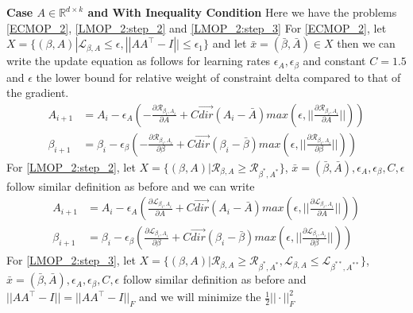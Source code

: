 \newline \textbf{Case $A \in \mathbb{R}^{d \times k}$ and With Inequality Condition}
\newline Here we have the problems \ref{ECMOP_2}, \ref{LMOP_2:step_2} and \ref{LMOP_2:step_3}
\newline For \ref{ECMOP_2}, let $X = \{(\beta, A) | \mathcal{L}_{\beta, A} \le \epsilon, ||AA^\top - I|| \le \epsilon_1\}$ and let $\bar{x} = (\bar{\beta},\bar{A}) \in X$ then we can write the update equation as follows for learning rates $\epsilon_A,\epsilon_{\beta}$ and constant $C=1.5$ and $\epsilon$ the lower bound for relative weight of constraint delta compared to that of the gradient.
\begin{equation}
\begin{aligned}
A_{i+1} &= A_{i} - \epsilon_A ( -\frac{\partial \mathcal{R}_{\beta_i, A_i}}{\partial A} + C \vec{dir}(A_i-\bar{A}) max(\epsilon,||\frac{\partial \mathcal{R}_{\beta_i, A_i}}{\partial A}||))\\
\beta_{i+1} &= \beta_{i} - \epsilon_{\beta} ( -\frac{\partial \mathcal{R}_{\beta_i, A_i}}{\partial \beta} + C \vec{dir}(\beta_i-\bar{\beta}) max(\epsilon,||\frac{\partial \mathcal{R}_{\beta_i, A_i}}{\partial \beta}||))
\end{aligned}    
\end{equation}
\newline For \ref{LMOP_2:step_2}, let $X = \{(\beta, A) | \mathcal{R}_{\beta, A} \ge \mathcal{R}_{\beta^{*}, A^{*}}\}$, $\bar{x} = (\bar{\beta},\bar{A}), \epsilon_A, \epsilon_{\beta}, C, \epsilon$ follow similar definition as before and we can write
\begin{equation}
\begin{aligned}
A_{i+1} &= A_{i} - \epsilon_A ( \frac{\partial \mathcal{L}_{\beta_i, A_i}}{\partial A} + C \vec{dir}(A_i-\bar{A}) max(\epsilon,||\frac{\partial \mathcal{L}_{\beta_i, A_i}}{\partial A}||))\\
\beta_{i+1} &= \beta_{i} - \epsilon_{\beta} ( \frac{\partial \mathcal{L}_{\beta_i, A_i}}{\partial \beta} + C \vec{dir}(\beta_i-\bar{\beta}) max(\epsilon,||\frac{\partial \mathcal{L}_{\beta_i, A_i}}{\partial \beta}||))
\end{aligned}    
\end{equation}
\newline For \ref{LMOP_2:step_3}, let $X = \{(\beta, A) | \mathcal{R}_{\beta, A} \ge \mathcal{R}_{\beta^{*}, A^{*}}, \mathcal{L}_{\beta, A} \le \mathcal{L}_{\beta^{**}, A^{**}}\}$, $\bar{x} = (\bar{\beta},\bar{A}), \epsilon_A, \epsilon_{\beta}, C, \epsilon$ follow similar definition as before and $|| AA^\top -I|| = || AA^\top -I||_F$ and we will minimize the $\frac{1}{2}||\cdot||^2_F$
